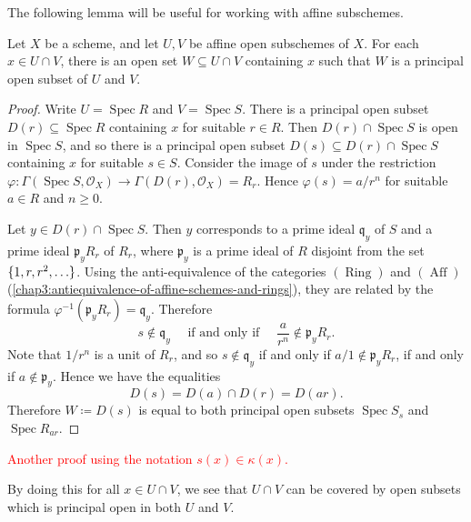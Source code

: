 \documentclass[12pt]{book}
\theoremstyle{definition}
\DeclarePairedDelimiter{\Set}{\lbrace}{\rbrace}
\DeclareMathOperator{\Spec}{Spec}
\newcommand{\Rings}{\operatorname{Ring}}
\newcommand{\Aff}{\operatorname{Aff}}
\newcommand{\todo}[1]{\textcolor{red}{#1}}
\begin{document}
	The following lemma will be useful for working with affine subschemes.
	
	\begin{lemma}\label{chap4:simultaneous-principal-open}
		Let $X$ be a scheme, and let $U, V$ be affine open subschemes of $X$. For each $x \in U \cap V$, there is an open set $W \subseteq U \cap V$ containing $x$ such that $W$ is a principal open subset of $U$ and $V$.
	\end{lemma}
	
	\begin{proof}
		Write $U = \Spec R$ and $V = \Spec S$. There is a principal open subset $D(r) \subseteq \Spec R$ containing $x$ for suitable $r \in R$. Then $D(r) \cap \Spec S$ is open in $\Spec S$, and so there is a principal open subset $D(s) \subseteq D(r) \cap \Spec S$ containing $x$ for suitable $s \in S$. Consider the image of $s$ under the restriction $\varphi\colon\Gamma(\Spec S, \mathcal{O}_X) \to \Gamma(D(r), \mathcal{O}_X) = R_r$. Hence $\varphi(s) = a/r^n$ for suitable $a \in R$ and $n \geq 0$. 
		
		Let $y \in D(r) \cap \Spec S$. Then $y$ corresponds to a prime ideal $\mathfrak{q}_y$ of $S$ and a prime ideal $\mathfrak{p}_yR_r$ of $R_r$, where $\mathfrak{p}_y$ is a prime ideal of $R$ disjoint from the set $\Set{1, r, r^2, \dotsc}$. Using the anti-equivalence of the categories $(\Rings)$ and $(\Aff)$ (\cref{chap3:antiequivalence-of-affine-schemes-and-rings}), they are related by the formula $\varphi^{-1}(\mathfrak{p}_yR_r) = \mathfrak{q}_y$. Therefore
		\begin{equation*}
			s \notin \mathfrak{q}_y \quad\text{ if and only if }\quad \frac{a}{r^n} \notin \mathfrak{p}_yR_r.
		\end{equation*}
		Note that $1/r^n$ is a unit of $R_r$, and so $s \notin \mathfrak{q}_y$ if and only if $a/1 \notin\mathfrak{p}_yR_r$, if and only if $a \notin \mathfrak{p}_y$. Hence we have the equalities
		\begin{equation*}
			D(s) = D(a) \cap D(r) = D(ar).
		\end{equation*}
		Therefore $W \coloneqq D(s)$ is equal to both principal open subsets $\Spec S_s$ and $\Spec R_{ar}$.
	\end{proof}
	
	\todo{Another proof using the notation $s(x) \in \kappa(x)$.}
	
	By doing this for all $x \in U \cap V$, we see that $U \cap V$ can be covered by open subsets which is principal open in both $U$ and $V$. 
	
\end{document}
